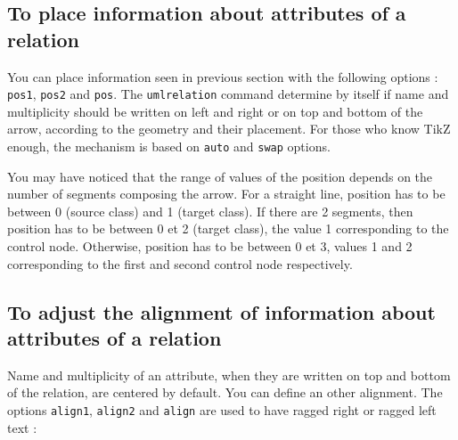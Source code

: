 \documentclass[a4paper,11pt]{report}
\newcommand{\inputTikZ}[1]{%
  }%
\newcommand{\inputTikZ}[1]{%
    \texttt{[image: fig/\#1.pdf]}%
  }%
\newcommand{\TikZ}{{\sc TikZ} \xspace}
\begin{document}
\subsection{To place information about attributes of a relation}\label{ss.relposattr}

You can place information seen in previous section with the following options : {\tt pos1}, {\tt pos2} and {\tt pos}.
The {\tt umlrelation} command determine by itself if name and multiplicity should be written on left and right or on top and bottom of the arrow, according to the geometry and their placement. For those who know \TikZ enough, the mechanism is based on {\tt auto} and {\tt swap} options.

\medskip

\begin{minipage}{0.5\textwidth}

\end{minipage}
\begin{minipage}{0.4\textwidth}
\begin{center}
\inputTikZ{relationpos}
\end{center}
\end{minipage}

\medskip

You may have noticed that the range of values of the position depends on the number of segments composing the arrow. For a straight line, position has to be between  0 (source class) and 1 (target class). If there are 2 segments, then position has to be between 0 et 2 (target class), the value 1 corresponding to the control node. Otherwise, position has to be between 0 et 3, values 1 and 2 corresponding to the first and second control node respectively.

\subsection{To adjust the alignment of information about attributes of a relation}\label{ss.relalign}

Name and multiplicity of an attribute, when they are written on top and bottom of the relation, are centered by default. You can define an other alignment.
The options {\tt align1}, {\tt align2} and {\tt align} are used to have ragged right or ragged left text :

\medskip

\begin{minipage}{0.5\textwidth}

\end{minipage}
\begin{minipage}{0.4\textwidth}
\begin{center}
\inputTikZ{relationalign}
\end{center}
\end{minipage}
\end{document}
